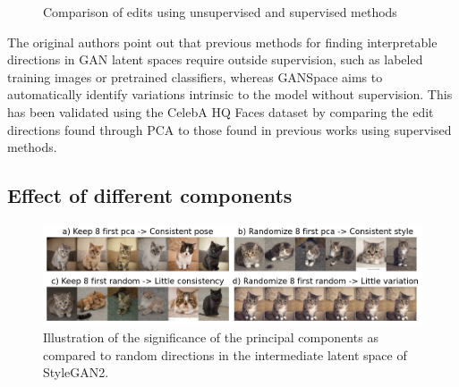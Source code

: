 \begin{figure}[H]



\caption{Comparison of edits using unsupervised and supervised methods}

\end{figure}

The original authors point out that previous methods for finding interpretable directions in GAN latent spaces require outside supervision, such as labeled training images or pretrained classifiers, whereas GANSpace aims to automatically identify variations intrinsic to the model without supervision. This has been validated using the CelebA HQ Faces dataset by comparing the edit directions found through PCA to those found in previous works using supervised methods.

\subsection{Effect of different components}

\begin{figure}[H]
    \centering
    \includegraphics[width=\textwidth]{figs/figure4_randomize_8_first_random-little_variation.png}
    \caption{Illustration of the significance of the principal components as compared to random directions in the intermediate latent space of StyleGAN2.}
    \label{fig:cats}
\end{figure}

